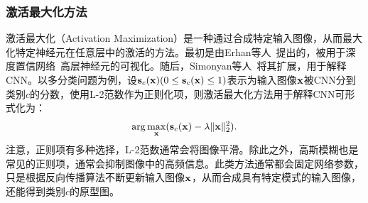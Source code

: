 \subsubsection*{激活最大化方法}
激活最大化（Activation Maximization）是一种通过合成特定输入图像，从而最大化特定神经元在任意层中的激活的方法。最初是由Erhan等人~\cite{erhan2009visualizing}提出的，被用于深度置信网络~\cite{hinton2006fast}高层神经元的可视化。随后，Simonyan等人~\cite{simonyan2013deep}将其扩展，用于解释CNN。以多分类问题为例，设$\mathbf{s}_{c}(\mathbf{x})(0\leq \mathbf{s}_{c}(\mathbf{x}) \leq 1)$表示为输入图像$\mathbf{x}$被CNN分到类别$c$的分数，使用L-2范数作为正则化项，则激活最大化方法用于解释CNN可形式化为：
\begin{equation}
\arg \max _{\mathbf{x}}( {\mathbf{s}}_{c}(\mathbf{x})-\lambda\|\mathbf{x}\|_{2}^{2}).
\end{equation}
注意，正则项有多种选择，L-2范数通常会将图像平滑。除此之外，高斯模糊也是常见的正则项，通常会抑制图像中的高频信息。此类方法通常都会固定网络参数，只是根据反向传播算法不断更新输入图像$\mathbf{x}$，从而合成具有特定模式的输入图像，还能得到类别$c$的原型图。


